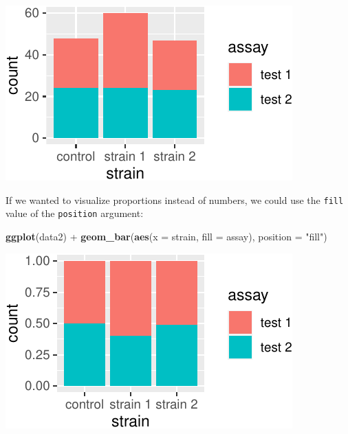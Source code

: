 \documentclass[]{book}
\newenvironment{Shaded}{}{}
\newcommand{\DataTypeTok}[1]{\textcolor[rgb]{0.56,0.13,0.00}{#1}}
\newcommand{\KeywordTok}[1]{\textcolor[rgb]{0.00,0.44,0.13}{\textbf{#1}}}
\newcommand{\NormalTok}[1]{#1}
\newcommand{\OperatorTok}[1]{\textcolor[rgb]{0.40,0.40,0.40}{#1}}
\newcommand{\StringTok}[1]{\textcolor[rgb]{0.25,0.44,0.63}{#1}}
\begin{document}
\begin{center}\includegraphics[width=\textwidth]{TRES-Tidy-Tutorial_files/figure-latex/unnamed-chunk-116-1} \end{center}

If we wanted to visualize proportions instead of numbers, we could use the \texttt{fill} value of the \texttt{position} argument:

\begin{Shaded}
\begin{Highlighting}[]
\KeywordTok{ggplot}\NormalTok{(data2) }\OperatorTok{+}
\StringTok{  }\KeywordTok{geom_bar}\NormalTok{(}\KeywordTok{aes}\NormalTok{(}\DataTypeTok{x =}\NormalTok{ strain, }\DataTypeTok{fill =}\NormalTok{ assay), }\DataTypeTok{position =} \StringTok{"fill"}\NormalTok{)}
\end{Highlighting}
\end{Shaded}

\begin{center}\includegraphics[width=\textwidth]{TRES-Tidy-Tutorial_files/figure-latex/unnamed-chunk-117-1} \end{center}
\end{document}
